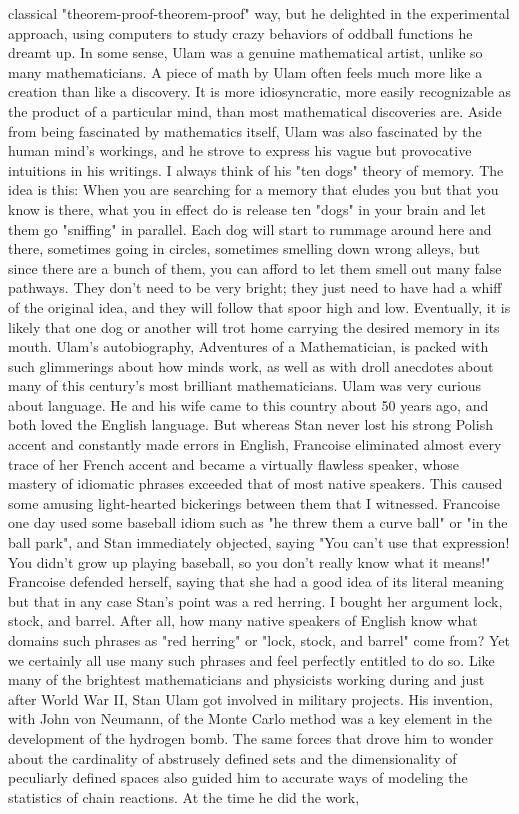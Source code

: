 classical "theorem-proof-theorem-proof" way, but he delighted in the experimental
approach, using computers to study crazy behaviors of oddball functions he dreamt
up. In some sense, Ulam was a genuine mathematical artist, unlike so many
mathematicians. A piece of math by Ulam often feels much more like a creation than
like a discovery. It is more idiosyncratic, more easily recognizable as the product of a
particular mind, than most mathematical discoveries are.
         Aside from being fascinated by mathematics itself, Ulam was also fascinated
by the human mind's workings, and he strove to express his vague but provocative
intuitions in his writings. I always think of his "ten dogs" theory of memory. The idea
is this: When you are searching for a memory that eludes you but that you know is
there, what you in effect do is release ten "dogs" in your brain and let them go
"sniffing" in parallel. Each dog will start to rummage around here and there,
sometimes going in circles, sometimes smelling down wrong alleys, but since there
are a bunch of them, you can afford to let them smell out many false pathways. They
don't need to be very bright; they just need to have had a whiff of the original idea,
and they will follow that spoor high and low. Eventually, it is likely that one dog or
another will trot home carrying the desired memory in its mouth. Ulam's
autobiography, Adventures of a Mathematician, is packed with such glimmerings
about how minds work, as well as with droll anecdotes about many of this century's
most brilliant mathematicians.
         Ulam was very curious about language. He and his wife came to this country
about 50 years ago, and both loved the English language. But whereas Stan never lost
his strong Polish accent and constantly made errors in English, Francoise eliminated
almost every trace of her French accent and became a virtually flawless speaker,
whose mastery of idiomatic phrases exceeded that of most native speakers. This
caused some amusing light-hearted bickerings between them that I witnessed.
Francoise one day used some baseball idiom such as "he threw them a curve ball" or
"in the ball park", and Stan immediately objected, saying "You can't use that
expression! You didn't grow up playing baseball, so you don't really know what it
means!" Francoise defended herself, saying that she had a good idea of its literal
meaning but that in any case Stan's point was a red herring. I bought her argument
lock, stock, and barrel. After all, how many native speakers of English know what
domains such phrases as "red herring" or "lock, stock, and barrel" come from? Yet we
certainly all use many such phrases and feel perfectly entitled to do so.
         Like many of the brightest mathematicians and physicists working during and
just after World War II, Stan Ulam got involved in military projects. His invention,
with John von Neumann, of the Monte Carlo method was a key element in the
development of the hydrogen bomb. The same forces that drove him to wonder about
the cardinality of abstrusely defined sets and the dimensionality of peculiarly defined
spaces also guided him to accurate ways of modeling the statistics of chain reactions.
At the time he did the work,




